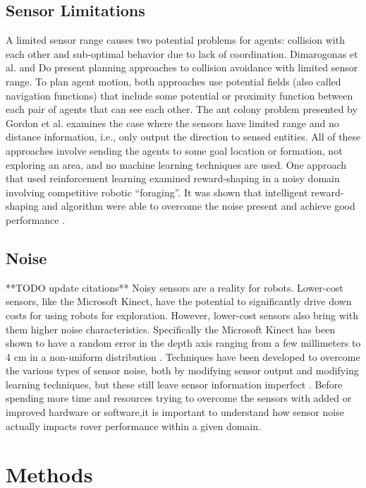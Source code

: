\documentclass[letterpaper, 10 pt, conference]{ieeeconf}  %
\begin{document}
\subsection{Sensor Limitations}
A limited sensor range causes two potential problems for agents:
collision with each other and sub-optimal behavior due to lack of
coordination. Dimarogonas et al. \cite{dimarogonas2007decentralized} and Do \cite{do2007bounded} present planning approaches to collision avoidance with limited sensor range. To plan agent motion, both approaches use potential fields (also called
navigation functions) that include some potential or proximity function between each pair of agents that can see each other. The ant colony problem presented by Gordon et al. \cite{gordon2004gathering} examines the case where the sensors have limited range and no distance information, i.e., only output the direction to sensed entities. All of these approaches involve sending the agents to some goal location or formation, not exploring an area, and no machine learning techniques are used. One approach that used reinforcement learning examined reward-shaping in a noisy domain involving competitive robotic “foraging”. It was shown that intelligent reward-shaping and algorithm were able to overcome the noise present and achieve good performance \cite{mataric1997reinforcement}.

\subsection{Noise}
**TODO update citations**
Noisy sensors are a reality for robots. Lower-cost sensors, like the Microsoft Kinect, have the potential to significantly drive down costs for using robots for exploration. However, lower-cost sensors also bring with them higher noise characteristics. Specifically the Microsoft Kinect has been shown to have a random error in the depth axis ranging from a few millimeters to 4 cm in a non-uniform distribution \cite{khoshelham2012accuracy,nguyen2012modeling}. Techniques have been developed to overcome the various types of sensor noise, both by modifying sensor output and modifying learning techniques, but these still leave sensor information imperfect \cite{nguyen2012modeling,hu2010distributed}. Before spending more time and resources trying to overcome the sensors with added or improved hardware or software,it is important to understand how sensor noise actually impacts rover performance within a given domain.


\section{Methods}
\end{document}
